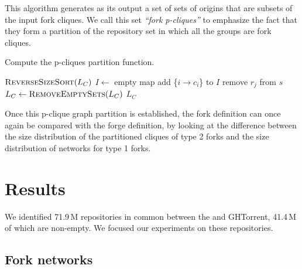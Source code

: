 This algorithm generates as its output a set of sets of origins that are
subsets of the input fork cliques. We call this set \emph{``fork p-cliques''}
to emphasize the fact that they form a partition of the repository set in which
all the groups are fork cliques.

\begin{algorithm}[t]
    \caption{Compute the p-cliques partition function.}%
    \label{algo:fork-clique-partition}
    \begin{algorithmic}
        \State $\Call{ReverseSizeSort}{L_C}$ 
        \State $I \gets$ empty map 
            \State add \{$i \rightarrow c_i$\} to $I$
        \EndFor
                        \State remove $r_j$ from $s$
                    \EndIf
                \EndFor
            \EndFor
        \EndFor
        \State $L_C \gets \Call{RemoveEmptySets}{L_C}$ 
        \State \Return $L_C$
    \EndFunction
    \end{algorithmic}
\end{algorithm}

Once this p-clique graph partition is established, the fork definition can once
again be compared with the forge definition, by looking at the difference
between the size distribution of the partitioned cliques of type 2 forks and
the size distribution of networks for type 1 forks.


\section{Results}%
\label{sec:forks-results}

We identified 71.9\,M repositories in common between the \SWHGD{} and GHTorrent,
41.4\,M of which are non-empty. We focused our experiments on these
repositories.

\subsection{Fork networks}%
\label{sec:results-fork-networks}

